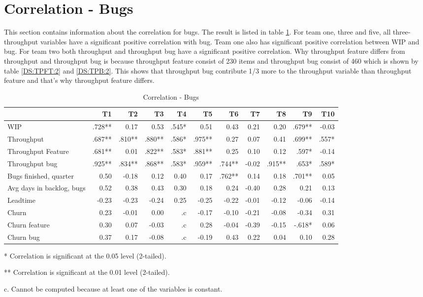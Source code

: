 \documentclass[UKenglish]{ifimaster}  %
\begin{document}
\section{Correlation - Bugs}
\label{sec:corr:bug}

This section contains information about the correlation for bugs. The result is listed in table \ref{corr:bug}. For team one, three and five, all three-throughput variables have a significant positive correlation with bug. Team one also has significant positive correlation between WIP and bug. For team two both throughput and throughput bug have a significant positive correlation. 
Why throughput feature differs from throughput and throughput bug is because throughput feature consist of 230 items and throughput bug consist of 460 which is shown by table \ref{DS:TPFT:2} and \ref{DS:TPB:2}. This shows that throughput bug contribute 1/3 more to the throughput variable than throughput feature and that's why throughput feature differs. 

\begin{table}[!htbp]
 \begin{adjustwidth}{-2.5cm}{}
 \centering
 \begin{tabular}{|l|r|r|r|r|r|r|r|r|r|r|}
\hline
 & T1 & T2 & T3 & T4 & T5 & T6 & T7 & T8 & T9 & T10\\ \hline
WIP &.728**& 0.17& 0.53& .545*& 0.51& 0.43& 0.21& 0.20& .679**& -0.03\\ \hline
Throughput &.687**& .810**& .880**& .586*& .975**& 0.27& 0.07& 0.41& .699**& .557*\\ \hline
Throughput Feature &.681**& 0.01& .822**& .583*& .881**& 0.25& 0.10& 0.12& .597*& -0.14\\ \hline
Throughput bug &.925**& .834**& .868**& .583*& .959**& .744**& -0.02& .915**& .653*& .589*\\ \hline
Bugs finished, quarter &0.50& -0.18& 0.12& 0.40& 0.17& .762**& 0.14& 0.18& .701**& 0.05\\ \hline
Avg days in backlog, bugs &0.52& 0.38& 0.43& 0.30& 0.18& 0.24& -0.40& 0.28& 0.21& 0.13\\ \hline
Leadtime &-0.23& -0.23& -0.24& 0.25& -0.25& -0.22& -0.01& -0.12& -0.06& -0.14\\ \hline
Churn &0.23& -0.01& 0.00& .c& -0.17& -0.10& -0.21& -0.08& -0.34& 0.31\\ \hline
Churn feature &0.30& 0.07& -0.03& .c& 0.28& -0.04& -0.39& -0.15& -.618*& 0.06\\ \hline
Churn bug &0.37& 0.17& -0.08& .c
& -0.19& 0.43& 0.22& 0.04& 0.10& 0.28\\ \hline

\end{tabular}
 \caption{Correlation - Bugs}
 \label{corr:bug}
 \centerline {* Correlation is significant at the 0.05 level (2-tailed).}
\centerline{** Correlation is significant at the 0.01 level (2-tailed).}
\centerline{c. Cannot be computed because at least one of the variables is constant.}
\end{adjustwidth}
\end{table}
\end{document}
